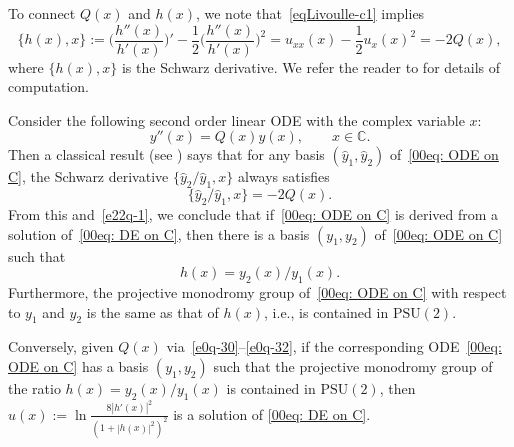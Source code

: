 \documentclass[pdftex]{sigma}
\numberwithin{equation}{section}
\def\PSU{\mathrm{PSU}}
\begin{document}
To connect $Q(x)$ and $h(x)$, we note that~\eqref{eqLivoulle-c1} implies
\begin{equation}\label{e22q-1}
\{h(x),x\}:=\biggl(\frac{h''(x)}{h'(x)}\biggr)'-\frac12 \biggl(\frac{h''(x)}{h'(x)}\biggr)^2=u_{xx}(x)-\frac12 u_x(x)^2=-2Q(x),
\end{equation}
where $\{h(x),x\}$ is the Schwarz derivative. We refer the reader to
\cite{Chai-Lin-Wang} for details of computation.

Consider the following second order linear ODE with the complex variable $x$:
\begin{equation}\label{00eq: ODE on C}
y''(x)=Q(x)y(x),\qquad x\in\mathbb{C}.
\end{equation}
Then a classical result (see \cite{Whittaker-Watson}) says that for
any basis $(\hat{y}_1,\hat{y}_2)$ of~\eqref{00eq: ODE on C}, the
Schwarz derivative $\{\hat{y}_2/\hat{y}_1,x\}$ always satisfies
\begin{equation*}
\{\hat{y}_2/\hat{y}_1,x\}=-2Q(x).
\end{equation*}
From this and~\eqref{e22q-1}, we conclude that if~\eqref{00eq: ODE on
 C} is derived from a solution of~\eqref{00eq: DE on C}, then there
is a basis $(y_1,y_2)$ of~\eqref{00eq: ODE on C} such that
\begin{equation}\label{e22q-2}
h(x)=y_2(x)/y_1(x).
\end{equation}
Furthermore, the projective monodromy group of~\eqref{00eq: ODE on C}
with respect to $y_1$ and $y_2$ is the same as that of $h(x)$, i.e., is
contained in $\PSU(2)$.

Conversely, given $Q(x)$ via~\eqref{e0q-30}--\eqref{e0q-32}, if the
corresponding ODE~\eqref{00eq: ODE on C} has a basis $(y_1,y_2)$ such
that the projective monodromy group of the ratio $h(x)=y_2(x)/y_1(x)$
is contained in $\PSU(2)$, then
$u(x):=\ln\frac{8|h'(x)|^2}{(1+|h(x)|^2)^2}$ is a solution of
\eqref{00eq: DE on C}.
\end{document}
